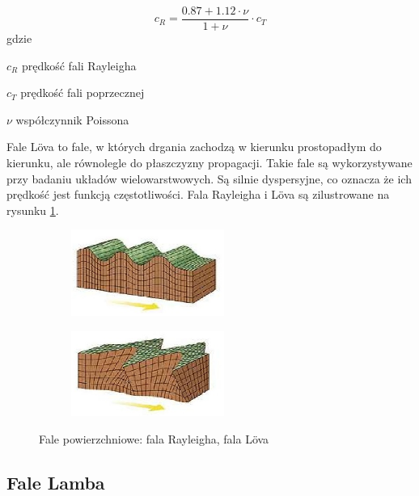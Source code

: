 \begin{equation}
c_R=\frac{0.87+1.12\cdot\nu}{1+\nu}\cdot c_T
\end{equation}
gdzie
\begin{eqwhere}[2cm]
        \item[$c_R$] prędkość fali Rayleigha
        \item[$c_T$] prędkość fali poprzecznej
        \item[$\nu$] współczynnik Poissona
\end{eqwhere}

Fale L\"{o}va to fale, w których drgania zachodzą w kierunku prostopadłym do kierunku, ale równolegle do płaszczyzny propagacji. Takie fale są wykorzystywane przy badaniu układów wielowarstwowych. Są silnie dyspersyjne, co oznacza że ich prędkość jest funkcją częstotliwości. Fala Rayleigha i L\"{o}va są zilustrowane na rysunku \ref{fig:fale_pow}.

\begin{figure}[h]
        \centering
        \begin{subfigure}{0.35\textwidth}
                \centering
	     \includegraphics[width=5cm]{Zdjecia/2/fala_rayleigha}
                \subcaption{\label{subfigure_a}}
        \end{subfigure}
        \begin{subfigure}{0.35\textwidth}
                \centering
	     \includegraphics[width=5cm]{Zdjecia/2/fala_lova}
                \subcaption{\label{subfigure_b}}
        \end{subfigure}
        \label{fig:fale_pow}
        \caption{Fale powierzchniowe: \protect{} fala Rayleigha, \protect{} fala L\"{o}va}
\end{figure}

\subsection{Fale Lamba}

